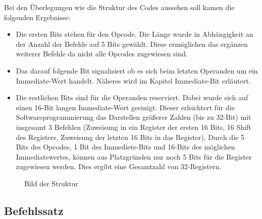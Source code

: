 \documentclass[paper=a4,fontsize=12pt,twocolumn]{scrreprt}
\begin{document}
Bei den Überlegungen wie die Struktur des Codes aussehen soll kamen die folgenden Ergebnisse: 
\begin{itemize}
    \item Die ersten Bits stehen für den Opcode.
    Die Länge wurde in Abhängigkeit an der Anzahl der Befehle auf 5 Bits gewählt.
    Diese ermöglichen das ergänzen weiterer Befehle da nicht alle Opcodes zugewiesen sind. 
    \item Das darauf folgende Bit signalisiert ob es sich beim letzten Operanden um ein Immediate-Wert handelt.
    Näheres wird im Kapitel Immediate-Bit erläutert.
    \item Die restlichen Bits sind für die Operanden reserviert.
    Dabei wurde sich auf einen 16-Bit langen Immediate-Wert geeinigt.
    Dieser erleichtert für die  Softwareprogrammierung das Darstellen größerer Zahlen (bis zu 32-Bit) mit insgesamt 3 Befehlen (Zuweisung in ein Register der ersten 16 Bits, 16 Shift des Registers, Zuweisung der letzten 16 Bits in das Register).
    Durch die 5 Bits des Opcodes, 1 Bit des Immediete-Bits und 16-Bits des möglichen Immediatewertes, können aus Platzgründen nur noch 5 Bits für die Register zugewiesen werden.
    Dies ergibt eine Gesamtzahl von 32-Registern.
\end{itemize}

\begin{figure}[h]
\centering
\caption{Bild der Struktur}
\end{figure}

\subsection{Befehlssatz}
\end{document}

